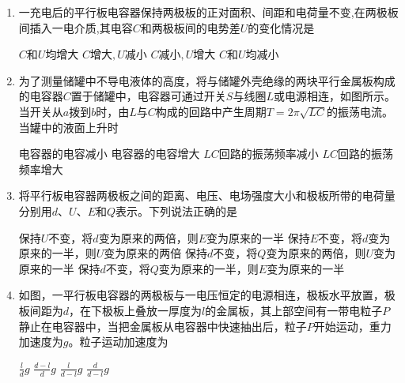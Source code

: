 

\begin{enumerate}[leftmargin=0em]
\renewcommand{\labelenumi}{\arabic{enumi}.}
\item
{}
一充电后的平行板电容器保持两极板的正对面积、间距和电荷量不变,在两极板间插入一电介质,其电容$ C $和两极板间的电势差$ U $的变化情况是  


\fourchoices
{$C $和$ U $均增大}
{$C $增大$ ,U $减小}
{$C $减小$ , U $增大}
{$C $和$ U $均减小}





\item
{}
为了测量储罐中不导电液体的高度，将与储罐外壳绝缘的两块平行金属板构成的电容器$ C $置于储罐中，电容器可通过开关$ S $与线圈$ L $或电源相连，如图所示。当开关从$ a $拨到$ b $时，由$ L $与$ C $构成的回路中产生周期$T = 2 \pi \sqrt { L C }$的振荡电流。当罐中的液面上升时  
\begin{figure}[h!]
\centering

\end{figure}


\fourchoices
{电容器的电容减小 }
{电容器的电容增大}
{$ LC $回路的振荡频率减小 }
{$ LC $回路的振荡频率增大}




\item
{}
将平行板电容器两极板之间的距离、电压、电场强度大小和极板所带的电荷量分别用$ d $、$ U $、$ E $和$ Q $表示。下列说法正确的是  


\fourchoices
{保持$ U $不变，将$ d $变为原来的两倍，则$ E $变为原来的一半}
{保持$ E $不变，将$ d $变为原来的一半，则$ U $变为原来的两倍}
{保持$ d $不变，将$ Q $变为原来的两倍，则$ U $变为原来的一半}
{保持$ d $不变，将$ Q $变为原来的一半，则$ E $变为原来的一半}





\item
{}
如图，一平行板电容器的两极板与一电压恒定的电源相连，极板水平放置，极板间距为$ d $，在下极板上叠放一厚度为$ l $的金属板，其上部空间有一带电粒子$ P $静止在电容器中，当把金属板从电容器中快速抽出后，粒子$ P $开始运动，重力加速度为$ g $。粒子运动加速度为  
\begin{figure}[h!]
\centering

\end{figure}
\fourchoices
{$\frac { l } { d } g$}
{$\frac { d - l } { d } g$}
{$\frac { l } { d - l } g$}
{$\frac { d } { d - l } g$}






\end{enumerate}
